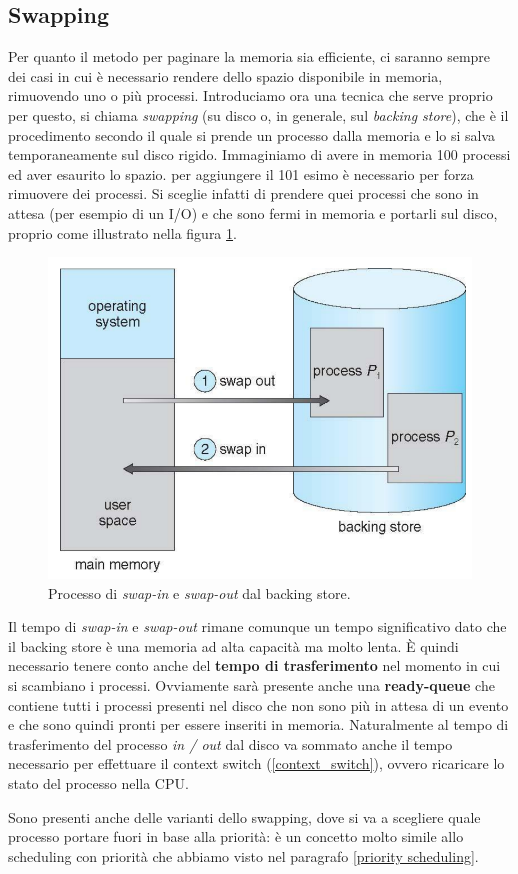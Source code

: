 % 
\subsection{Swapping}\label{swapping}
Per quanto il metodo per paginare la memoria sia efficiente, ci saranno sempre dei casi in cui è necessario rendere dello spazio disponibile in memoria, rimuovendo uno o più processi. Introduciamo ora una tecnica che serve proprio per questo, si chiama \textit{swapping} (su disco o, in generale, sul \textit{backing store}), che è il procedimento secondo il quale si prende un processo dalla memoria e lo si salva temporaneamente sul disco rigido. Immaginiamo di avere in memoria 100 processi ed aver esaurito lo spazio. per aggiungere il 101 esimo è necessario per forza rimuovere dei processi. Si sceglie infatti di prendere quei processi che sono in attesa (per esempio di un I/O) e che sono fermi in memoria e portarli sul disco, proprio come illustrato nella figura \ref{fig:swapping}.
\begin{figure}[h]
    \centering
    \includegraphics[width = .45\textwidth]{../res/imgs/main memory/swapping.png}
    \caption{Processo di \textit{swap-in} e \textit{swap-out} dal backing store.}
    \label{fig:swapping}
\end{figure}
Il tempo di \textit{swap-in} e \textit{swap-out} rimane comunque un tempo significativo dato che il backing store è una memoria ad alta capacità ma molto lenta. È quindi necessario tenere conto anche del \textbf{tempo di trasferimento} nel momento in cui si scambiano i processi. Ovviamente sarà presente anche una \textbf{ready-queue} che contiene tutti i processi presenti nel disco che non sono più in attesa di un evento e che sono quindi pronti per essere inseriti in memoria. Naturalmente al tempo di trasferimento del processo \textit{in / out} dal disco va sommato anche il tempo necessario per effettuare il context switch (\ref{context_switch}), ovvero ricaricare lo stato del processo nella CPU.

Sono presenti anche delle varianti dello swapping, dove si va a scegliere quale processo portare fuori in base alla priorità: è un concetto molto simile allo scheduling con priorità che abbiamo visto nel paragrafo \ref{priority scheduling}.

